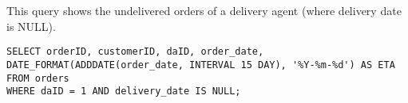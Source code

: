 This query shows the undelivered orders of a delivery agent (where delivery date is NULL).

\begin{lstlisting}
SELECT orderID, customerID, daID, order_date,
DATE_FORMAT(ADDDATE(order_date, INTERVAL 15 DAY), '%Y-%m-%d') AS ETA
FROM orders
WHERE daID = 1 AND delivery_date IS NULL;
\end{lstlisting}